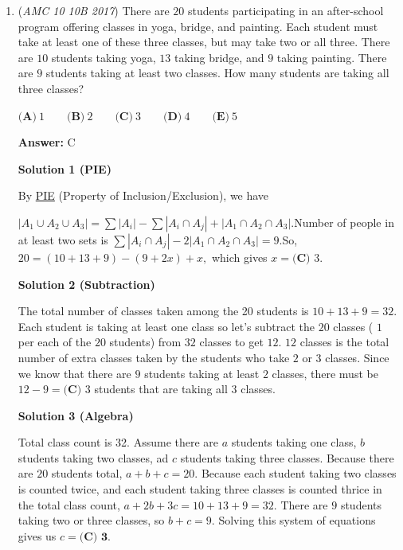 \begin{enumerate}
 


	\item (\textit{AMC 10 10B 2017}) There are $20$ students participating in an after-school program offering classes in yoga, bridge, and painting. Each student must take at least one of these three classes, but may take two or all three. There are $10$ students taking yoga, $13$ taking bridge, and $9$ taking painting. There are $9$ students taking at least two classes. How many students are taking all three classes?


 $\textbf{(A)}\ 1\qquad\textbf{(B)}\ 2\qquad\textbf{(C)}\ 3\qquad\textbf{(D)}\ 4\qquad\textbf{(E)}\ 5$

 \textbf{Answer: }C



\textbf{Solution 1 (PIE)}

By \href{https://artofproblemsolving.com/wiki/index.php?title=PIE}{PIE} (Property of Inclusion/Exclusion), we have

 $|A_1 \cup A_2 \cup A_3| = \sum |A_i| - \sum |A_i \cap A_j| + |A_1 \cap A_2 \cap A_3|.$Number of people in at least two sets is $\sum |A_i \cap A_j| - 2|A_1 \cap A_2 \cap A_3| = 9.$So, $20 = (10 + 13 + 9) - (9 + 2x) + x,$ which gives $x = \boxed{\textbf{(C) } 3}.$




\textbf{Solution 2 (Subtraction)}

The total number of classes taken among the 20 students is $10 + 13 + 9 = 32$. Each student is taking at least one class so let's subtract the $20$ classes ( $1$ per each of the $20$ students) from $32$ classes to get $12$. $12$ classes is the total number of extra classes taken by the students who take $2$ or $3$ classes. Since we know that there are $9$ students taking at least $2$ classes, there must be $12 - 9 = \boxed{\textbf{(C) } 3}$ students that are taking all $3$ classes.

 



\textbf{Solution 3 (Algebra)}

Total class count is 32. Assume there are $a$ students taking one class, $b$ students taking two classes, ad $c$ students taking three classes. Because there are $20$ students total, $a+b+c = 20$. Because each student taking two classes is counted twice, and each student taking three classes is counted thrice in the total class count, $a+2b+3c = 10+13+9 = 32$. There are $9$ students taking two or three classes, so $b+c = 9$. Solving this system of equations gives us $c=\boxed{\textbf{(C) 3}}$.


\end{enumerate}
